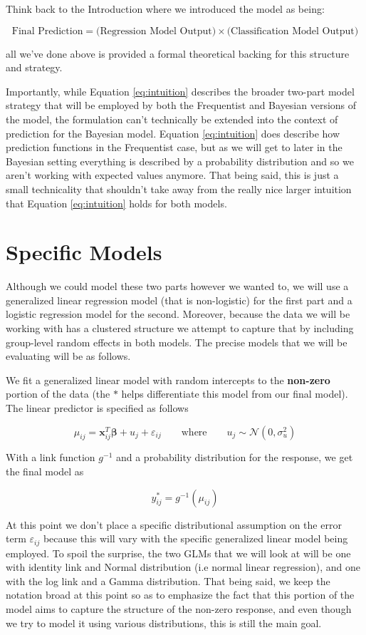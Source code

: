 \documentclass[12pt,twoside]{reedthesis}
\begin{document}
Think back to the Introduction where we introduced the model as being:

\[
\text{Final Prediction} = \bigg(\text{Regression Model Output}\bigg) \times \bigg(\text{Classification Model Output}\bigg)
\]

all we've done above is provided a formal theoretical backing for this structure and strategy.

Importantly, while Equation \eqref{eq:intuition} describes the broader two-part model strategy that will be employed by both the Frequentist and Bayesian versions of the model, the formulation can't technically be extended into the context of prediction for the Bayesian model. Equation \eqref{eq:intuition} does describe how prediction functions in the Frequentist case, but as we will get to later in the Bayesian setting everything is described by a probability distribution and so we aren't working with expected values anymore. That being said, this is just a small technicality that shouldn't take away from the really nice larger intuition that Equation \eqref{eq:intuition} holds for both models.

\hypertarget{specific-models}{%
\section{Specific Models}\label{specific-models}}

Although we could model these two parts however we wanted to, we will use a generalized linear regression model (that is non-logistic) for the first part and a logistic regression model for the second. Moreover, because the data we will be working with has a clustered structure we attempt to capture that by including group-level random effects in both models. The precise models that we will be evaluating will be as follows.

We fit a generalized linear model with random intercepts to the \textbf{non-zero} portion of the data (the \(*\) helps differentiate this model from our final model). The linear predictor is specified as follows

\[
\mu_{ij} = \mathbf{x}_{ij}^T\boldsymbol{\beta} + u_j + \varepsilon_{ij} \qquad \text{where} \qquad u_j \sim \mathcal{N}(0, \sigma_{u}^2)
\]

With a link function \(g^{-1}\) and a probability distribution for the response, we get the final model as

\[
y^*_{ij} = g^{-1}(\mu_{ij})
\]

At this point we don't place a specific distributional assumption on the error term \(\varepsilon_{ij}\) because this will vary with the specific generalized linear model being employed. To spoil the surprise, the two GLMs that we will look at will be one with identity link and Normal distribution (i.e normal linear regression), and one with the log link and a Gamma distribution. That being said, we keep the notation broad at this point so as to emphasize the fact that this portion of the model aims to capture the structure of the non-zero response, and even though we try to model it using various distributions, this is still the main goal.
\end{document}
